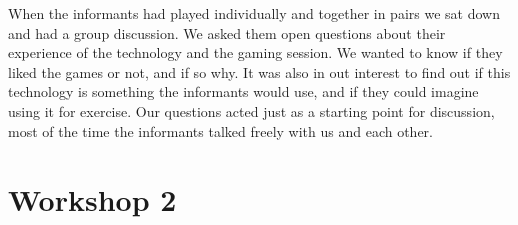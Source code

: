 When the informants had played individually and together in pairs we sat down and had a group discussion. We asked them open questions about their experience of the technology and the gaming session. We wanted to know if they liked the games or not, and if so why. It was also in out interest to find out if this technology is something the informants would use, and if they could imagine using it for exercise. Our questions acted just as a starting point for discussion, most of the time the informants talked freely with us and each other.                   

\section{Workshop 2}